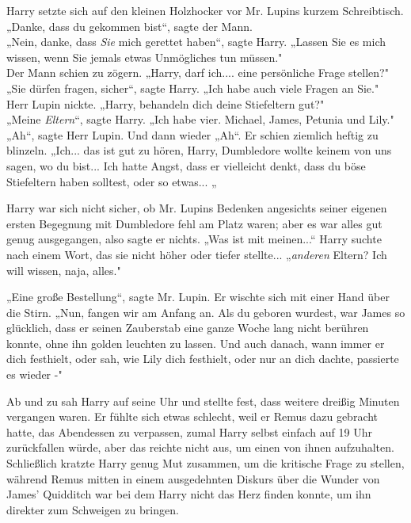 {Harry setzte sich auf den kleinen Holzhocker vor Mr. Lupins kurzem Schreibtisch.\\ „Danke, dass du gekommen bist“, sagte der Mann.\\ „Nein, danke, dass \emph{Sie} mich gerettet haben“, sagte Harry. „Lassen Sie es mich wissen, wenn Sie jemals etwas Unmögliches tun müssen."\\ Der Mann schien zu zögern. „Harry, darf ich.... eine persönliche Frage stellen?"\\ „Sie dürfen fragen, sicher“, sagte Harry. „Ich habe auch viele Fragen an Sie."\\ Herr Lupin nickte. „Harry, behandeln dich deine Stiefeltern gut?"\\ „Meine \emph{Eltern}“, sagte Harry. „Ich habe vier. Michael, James, Petunia und Lily."\\ „Ah“, sagte Herr Lupin. Und dann wieder „Ah“. Er schien ziemlich heftig zu blinzeln. „Ich... das ist gut zu hören, Harry, Dumbledore wollte keinem von uns sagen, wo du bist... Ich hatte Angst, dass er vielleicht denkt, dass du böse Stiefeltern haben solltest, oder so etwas... „

Harry war sich nicht sicher, ob Mr. Lupins Bedenken angesichts seiner eigenen ersten Begegnung mit Dumbledore fehl am Platz waren; aber es war alles gut genug ausgegangen, also sagte er nichts. „Was ist mit meinen...“ Harry suchte nach einem Wort, das sie nicht höher oder tiefer stellte... „\emph{anderen} Eltern? Ich will wissen, naja, alles."

„Eine große Bestellung“, sagte Mr. Lupin. Er wischte sich mit einer Hand über die Stirn. „Nun, fangen wir am Anfang an. Als du geboren wurdest, war James so glücklich, dass er seinen Zauberstab eine ganze Woche lang nicht berühren konnte, ohne ihn golden leuchten zu lassen. Und auch danach, wann immer er dich festhielt, oder sah, wie Lily dich festhielt, oder nur an dich dachte, passierte es wieder -"

Ab und zu sah Harry auf seine Uhr und stellte fest, dass weitere dreißig Minuten vergangen waren. Er fühlte sich etwas schlecht, weil er Remus dazu gebracht hatte, das Abendessen zu verpassen, zumal Harry selbst einfach auf 19 Uhr zurückfallen würde, aber das reichte nicht aus, um einen von ihnen aufzuhalten.\\ Schließlich kratzte Harry genug Mut zusammen, um die kritische Frage zu stellen, während Remus mitten in einem ausgedehnten Diskurs über die Wunder von James' Quidditch war bei dem Harry nicht das Herz finden konnte, um ihn direkter zum Schweigen zu bringen.

}

